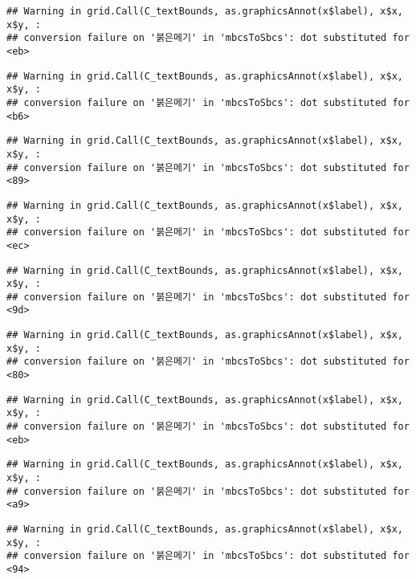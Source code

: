 \documentclass[
]{article}
\begin{document}
\begin{verbatim}
## Warning in grid.Call(C_textBounds, as.graphicsAnnot(x$label), x$x, x$y, :
## conversion failure on '붉은메기' in 'mbcsToSbcs': dot substituted for <eb>
\end{verbatim}

\begin{verbatim}
## Warning in grid.Call(C_textBounds, as.graphicsAnnot(x$label), x$x, x$y, :
## conversion failure on '붉은메기' in 'mbcsToSbcs': dot substituted for <b6>
\end{verbatim}

\begin{verbatim}
## Warning in grid.Call(C_textBounds, as.graphicsAnnot(x$label), x$x, x$y, :
## conversion failure on '붉은메기' in 'mbcsToSbcs': dot substituted for <89>
\end{verbatim}

\begin{verbatim}
## Warning in grid.Call(C_textBounds, as.graphicsAnnot(x$label), x$x, x$y, :
## conversion failure on '붉은메기' in 'mbcsToSbcs': dot substituted for <ec>
\end{verbatim}

\begin{verbatim}
## Warning in grid.Call(C_textBounds, as.graphicsAnnot(x$label), x$x, x$y, :
## conversion failure on '붉은메기' in 'mbcsToSbcs': dot substituted for <9d>
\end{verbatim}

\begin{verbatim}
## Warning in grid.Call(C_textBounds, as.graphicsAnnot(x$label), x$x, x$y, :
## conversion failure on '붉은메기' in 'mbcsToSbcs': dot substituted for <80>
\end{verbatim}

\begin{verbatim}
## Warning in grid.Call(C_textBounds, as.graphicsAnnot(x$label), x$x, x$y, :
## conversion failure on '붉은메기' in 'mbcsToSbcs': dot substituted for <eb>
\end{verbatim}

\begin{verbatim}
## Warning in grid.Call(C_textBounds, as.graphicsAnnot(x$label), x$x, x$y, :
## conversion failure on '붉은메기' in 'mbcsToSbcs': dot substituted for <a9>
\end{verbatim}

\begin{verbatim}
## Warning in grid.Call(C_textBounds, as.graphicsAnnot(x$label), x$x, x$y, :
## conversion failure on '붉은메기' in 'mbcsToSbcs': dot substituted for <94>
\end{verbatim}
\end{document}
